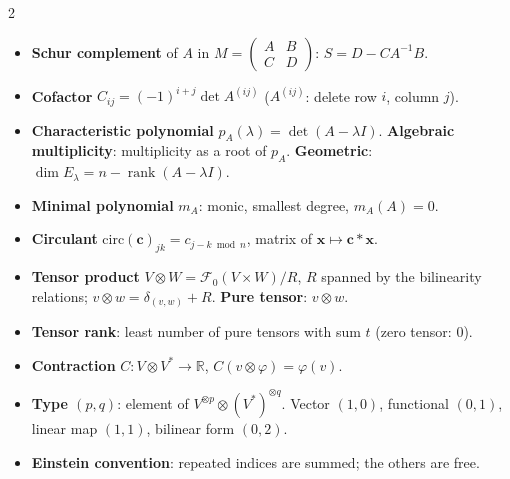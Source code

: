 \documentclass[10pt]{article}
\DeclareMathOperator{\rank}{rank}
\newcommand{\topic}[1]{\par\smallskip\noindent{\color{blue!50!black}\textbf{#1}}\par}
\begin{document}
\begin{multicols}{2}
\topic{Matrices}
\begin{itemize}
    \item \textbf{Schur complement} of $A$ in $M = \begin{pmatrix} A & B \\ C & D \end{pmatrix}$: $S = D - CA^{-1}B$.
    \item \textbf{Cofactor} $C_{ij} = (-1)^{i+j}\det A^{(ij)}$ ($A^{(ij)}$: delete row $i$, column $j$).
    \item \textbf{Characteristic polynomial} $p_A(\lambda) = \det(A - \lambda I)$. \textbf{Algebraic multiplicity}: multiplicity as a root of $p_A$. \textbf{Geometric}: $\dim E_\lambda = n - \rank(A - \lambda I)$.
    \item \textbf{Minimal polynomial} $m_A$: monic, smallest degree, $m_A(A) = 0$.
    \item \textbf{Circulant} $\mathrm{circ}(\mathbf{c})_{jk} = c_{j - k \bmod n}$, matrix of $\mathbf{x} \mapsto \mathbf{c} \ast \mathbf{x}$.
\end{itemize}

\topic{Tensors}
\begin{itemize}
    \item \textbf{Tensor product} $V \otimes W = \mathcal{F}_0(V \times W)/R$, $R$ spanned by the bilinearity relations; $v \otimes w = \delta_{(v,w)} + R$. \textbf{Pure tensor}: $v \otimes w$.
    \item \textbf{Tensor rank}: least number of pure tensors with sum $t$ (zero tensor: $0$).
    \item \textbf{Contraction} $C: V \otimes V^* \to \mathbb{R}$, $C(v \otimes \varphi) = \varphi(v)$.
    \item \textbf{Type $(p, q)$}: element of $V^{\otimes p} \otimes (V^*)^{\otimes q}$. Vector $(1,0)$, functional $(0,1)$, linear map $(1,1)$, bilinear form $(0,2)$.
    \item \textbf{Einstein convention}: repeated indices are summed; the others are free.
\end{itemize}


\end{multicols}
\end{document}
